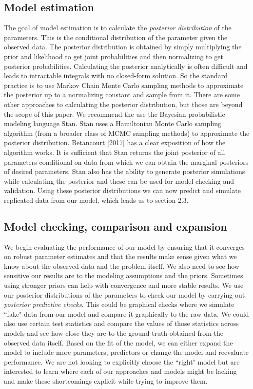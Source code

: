 \documentclass[12pt, oneside]{article}
\begin{document}
\subsection{Model estimation}
The goal of model estimation is to calculate the \textit{posterior distribution} of the parameters. This is the conditional distribution of the parameter given the observed data. The posterior distribution is obtained by simply multiplying the prior and likelihood to get joint probabilities and then normalizing to get posterior probabilities. Calculating the posterior analytically is often difficult and leads to intractable integrals with no closed-form solution. So the standard practice is to use Markov Chain Monte Carlo sampling methods to approximate the posterior up to a normalizing constant and sample from it. There are some other approaches to calculating the posterior distribution, but those are beyond the scope of this paper. We recommend the use the Bayesian probabilistic modeling language Stan. Stan uses a Hamiltonian Monte Carlo sampling algorithm (from a broader class of MCMC sampling methods) to approximate the posterior distribution. Betancourt [2017] has a clear exposition of how the algorithm works. It is sufficient that Stan returns the joint posterior of all parameters conditional on data from which we can obtain the marginal posteriors of desired parameters. Stan also has the ability to generate posterior simulations while calculating the posterior and these can be used for model checking and validation. Using these posterior distributions we can now predict and simulate replicated data from our model, which leads us to section 2.3. 
\subsection{Model checking, comparison and expansion}
We begin evaluating the performance of our model by ensuring that it converges on robust parameter estimates and that the results make sense given what we know about the observed data and the problem itself. We also need to see how sensitive our results are to the modeling assumptions and the priors. Sometimes using stronger priors can help with convergence and more stable results. We use our posterior distributions of the parameters to check our model by carrying out \textit{posterior predictive checks}. This could be graphical checks where we simulate ``fake" data from our model and compare it graphically to the raw data. We could also use certain test statistics and compare the values of those statistics across models and see how close they are to the ground truth obtained from the observed data itself. Based on the fit of the model, we can either expand the model to include more parameters, predictors or change the model and reevaluate performance. We are not looking to explicitly choose the ``right" model but are interested to learn where each of our approaches and models might be lacking and make these shortcomings explicit while trying to improve them.
\end{document}
